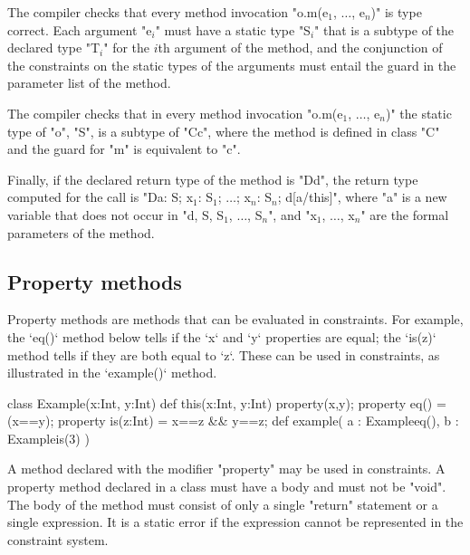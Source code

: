 \begin{staticrule*}
    The compiler checks that every method invocation
    \xcdmath"o.m(e$_1$, $\dots$, e$_n$)"
    is type correct. Each argument
    \xcdmath"e$_i$" must have a
    static type \xcdmath"S$_i$" that is a subtype of the declared type
    \xcdmath"T$_i$" for the $i$th
    argument of the method, and the conjunction of the constraints on the
    static types 
    of the arguments must entail the guard in the parameter list
    of the method.

    The compiler checks that in every method invocation
    \xcdmath"o.m(e$_1$, $\dots$, e$_n$)"
    the static type of \xcd"o", \xcd"S", is a subtype of \xcd"C{c}", where the method
    is defined in class \xcd"C" and the guard for \xcd"m" is equivalent to
    \xcd"c".

    Finally, if the declared return type of the method is
    \xcd"D{d}", the
    return type computed for the call is
    \xcdmath"D{a: S; x$_1$: S$_1$; $\dots$; x$_n$: S$_n$; d[a/this]}",
    where \xcd"a" is a new
    variable that does not occur in
    \xcdmath"d, S, S$_1$, $\dots$, S$_n$", and
    \xcdmath"x$_1$, $\dots$, x$_n$" are the formal
    parameters of the method.
\end{staticrule*}



\subsection{Property methods}

Property methods are methods that can be evaluated in constraints.  
For example, the \xcd`eq()` method below tells if the \xcd`x` and \xcd`y`
properties are equal; the \xcd`is(z)` method tells if they are both equal to
\xcd`z`.  These can be used in constraints, as illustrated in the
\xcd`example()` method.
\begin{xten}
class Example(x:Int, y:Int) {
   def this(x:Int, y:Int) { property(x,y); }
   property eq() = (x==y);
   property is(z:Int) = x==z && y==z;
   def example( a : Example{eq()}, b : Example{is(3)} ) {}
}
\end{xten}
%


A method declared with the modifier \xcd"property" may be used
in constraints.  A property method declared in a class must have
a body and must not be \xcd"void".  The body of the method must
consist of only a single \xcd"return" statement or a single
expression.  It is a static error if the expression cannot be
represented in the constraint system. 

